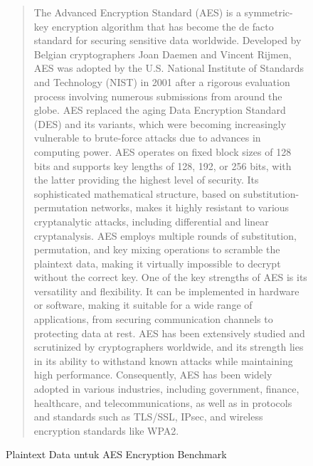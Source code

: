 \begin{figure}
    \begin{quote}
        The Advanced Encryption Standard (AES) is a symmetric-key encryption algorithm that has become the de facto standard for securing sensitive data worldwide. Developed by Belgian cryptographers Joan Daemen and Vincent Rijmen, AES was adopted by the U.S. National Institute of Standards and Technology (NIST) in 2001 after a rigorous evaluation process involving numerous submissions from around the globe. AES replaced the aging Data Encryption Standard (DES) and its variants, which were becoming increasingly vulnerable to brute-force attacks due to advances in computing power. AES operates on fixed block sizes of 128 bits and supports key lengths of 128, 192, or 256 bits, with the latter providing the highest level of security. Its sophisticated mathematical structure, based on substitution-permutation networks, makes it highly resistant to various cryptanalytic attacks, including differential and linear cryptanalysis. AES employs multiple rounds of substitution, permutation, and key mixing operations to scramble the plaintext data, making it virtually impossible to decrypt without the correct key. One of the key strengths of AES is its versatility and flexibility. It can be implemented in hardware or software, making it suitable for a wide range of applications, from securing communication channels to protecting data at rest. AES has been extensively studied and scrutinized by cryptographers worldwide, and its strength lies in its ability to withstand known attacks while maintaining high performance. Consequently, AES has been widely adopted in various industries, including government, finance, healthcare, and telecommunications, as well as in protocols and standards such as TLS/SSL, IPsec, and wireless encryption standards like WPA2.
    \end{quote}
    \caption{Plaintext Data untuk AES Encryption Benchmark}
    \label{fig:aesPlaintextData}
\end{figure}
